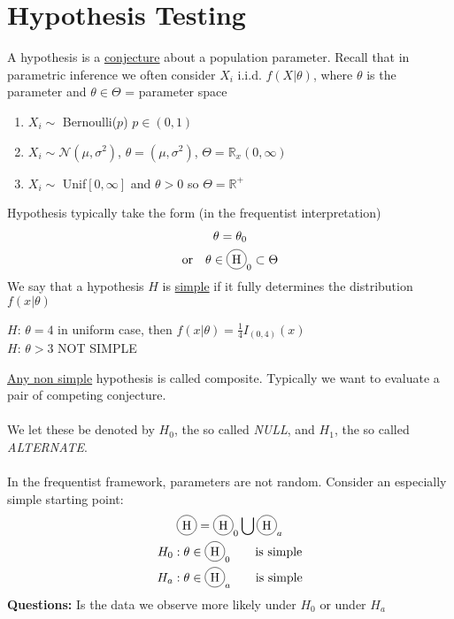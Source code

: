 \section*{Hypothesis Testing}
A hypothesis is a \underline{conjecture} about a population parameter. Recall that in parametric inference we often consider $X_i$ i.i.d. $f(X|\theta)$, where $\theta$ is the parameter and $\theta \in \Theta$ = parameter space
\begin{example}
	\begin{enumerate}
		\item $X_i \sim$ Bernoulli($p$) \qquad $p \in (0,1)$
		\item $X_i \sim \mathcal{N}(\mu, \sigma^2)$, \quad $\theta = (\mu, \sigma^2)$, \quad $\Theta = \mathbb{R}_x(0, \infty)$
		\item $X_i \sim $ Unif$[0, \infty]$ and $\theta > 0$ so $\Theta = \mathbb{R}^+$
	\end{enumerate}
\end{example}
Hypothesis typically take the form (in the frequentist interpretation)
\begin{gather*}
	\theta = \theta_0\\
	\text{or} \quad \theta \in \circled{H}_0 \subset \Theta
\end{gather*}
We say that a hypothesis $H$ is \underline{simple} if it fully determines the distribution $f(x|\theta)$
\begin{example}
$H$: $\theta = 4$ in uniform case, then $f(x|\theta) = \frac{1}{4} I_{(0, 4)} (x)$\\
$H$: $\theta > 3$ NOT SIMPLE
\end{example}
\underline{Any non simple} hypothesis is called composite. Typically we want to evaluate a pair of competing conjecture.\\\\
We let these be denoted by $H_0$, the so called \emph{NULL}, and $H_1$, the so called \emph{ALTERNATE}.\\\\
In  the frequentist framework, parameters are not random. Consider an especially simple starting point:
\begin{gather*}
	\circled{H} = \circled{H}_0 \bigcup \circled{H}_a\\
	H_0 : \theta \in \circled{H}_0 \qquad \text{is simple}\\
	H_a : \theta \in \circled{H}_a \qquad \text{is simple}
\end{gather*}
\textbf{Questions:} Is the data we observe more likely under $H_0$ or under $H_a$\\\\
